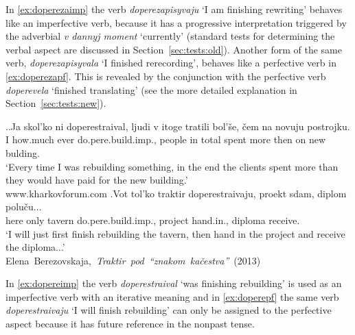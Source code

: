 In \ref{ex:doperezaimp} the verb \textit{doperezapisyvaju} `I am finishing rewriting' behaves like an imperfective verb, because it has a progressive interpretation triggered by the adverbial \textit{v dannyj moment} `currently' (standard tests for determining the verbal aspect are discussed in Section~\ref{sec:tests:old}). Another form of the same verb, \textit{doperezapisyvala} `I finished rerecording', behaves like a perfective verb in \ref{ex:doperezapf}. This is revealed by the conjunction with the perfective verb \textit{doperevela} `finished translating' (see the more detailed explanation in Section~\ref{sec:tests:new}).

\ex.\ag.\label{ex:dopereimp}Ja skol'ko ni doperestraival, ljudi v itoge tratili bol'\v{s}e, \v{c}em na novuju postrojku.\\
I how.much ever do.pere.build.imp., people in total spent more then on new bulding.\\
\trans `Every time I was rebuilding something, in the end the clients spent more than they would have paid for the new building.'\\
\hbox{}\hfill\hbox{www.kharkovforum.com}
\bg.\label{ex:doperepf}Vot tol'ko traktir doperestraivaju, proekt sdam, diplom polu\v{c}u...\\
here only tavern do.pere.build.imp., project hand.in., diploma receive.\\
\trans `I will just first finish rebuilding the tavern, then hand in the project and receive the diploma...'\\
\hbox{}\hfill\hbox{Elena Berezovskaja, \textit{Traktir pod ``znakom ka\v{c}estva''} (2013)}

In \ref{ex:dopereimp} the verb \textit{doperestraival} `was finishing rebuilding' is used as an imperfective verb with an iterative meaning and in \ref{ex:doperepf} the same verb \textit{doperestraivaju} `I will finish rebuilding' can only be assigned to the perfective aspect because it has future reference in the nonpast tense.


